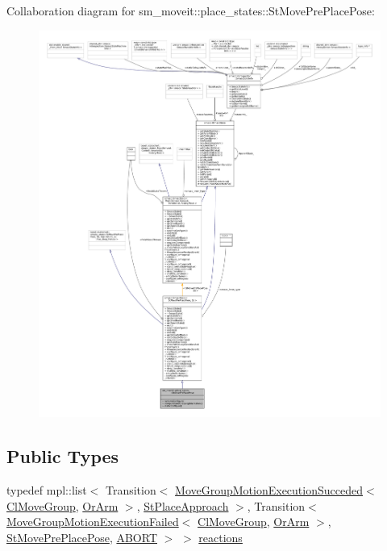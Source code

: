 Collaboration diagram for sm\+\_\+moveit\+:\+:place\+\_\+states\+:\+:St\+Move\+Pre\+Place\+Pose\+:
\nopagebreak
\begin{figure}[H]
\begin{center}
\leavevmode
\includegraphics[width=350pt]{structsm__moveit_1_1place__states_1_1StMovePrePlacePose__coll__graph}
\end{center}
\end{figure}
\subsection*{Public Types}
\begin{DoxyCompactItemize}
\item 
typedef mpl\+::list$<$ Transition$<$ \hyperlink{structmove__group__interface__client_1_1MoveGroupMotionExecutionSucceded}{Move\+Group\+Motion\+Execution\+Succeded}$<$ \hyperlink{classmove__group__interface__client_1_1ClMoveGroup}{Cl\+Move\+Group}, \hyperlink{classsm__moveit_1_1OrArm}{Or\+Arm} $>$, \hyperlink{structsm__moveit_1_1place__states_1_1StPlaceApproach}{St\+Place\+Approach} $>$, Transition$<$ \hyperlink{structmove__group__interface__client_1_1MoveGroupMotionExecutionFailed}{Move\+Group\+Motion\+Execution\+Failed}$<$ \hyperlink{classmove__group__interface__client_1_1ClMoveGroup}{Cl\+Move\+Group}, \hyperlink{classsm__moveit_1_1OrArm}{Or\+Arm} $>$, \hyperlink{structsm__moveit_1_1place__states_1_1StMovePrePlacePose}{St\+Move\+Pre\+Place\+Pose}, \hyperlink{classABORT}{A\+B\+O\+RT} $>$ $>$ \hyperlink{structsm__moveit_1_1place__states_1_1StMovePrePlacePose_aba9e304feab2249eac1087dd2e4f6719}{reactions}
\end{DoxyCompactItemize}
